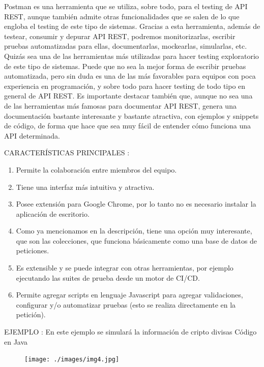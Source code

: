 \documentclass[letterpaper, 12pt, spanish]{article}
\begin{document}
Postman es una herramienta que se utiliza, sobre todo, para el testing de API REST, aunque también admite otras funcionalidades que se salen de lo que engloba el testing de este tipo de sistemas.
Gracias a esta herramienta, además de testear, consumir y depurar API REST, podremos monitorizarlas, escribir pruebas automatizadas para ellas, documentarlas, mockearlas, simularlas, etc.
Quizás sea una de las herramientas más utilizadas para hacer testing exploratorio de este tipo de sistemas. Puede que no sea la mejor forma de escribir pruebas automatizada, pero sin duda es una de las más favorables para equipos con poca experiencia en programación, y sobre todo para hacer testing de todo tipo en general de API REST.
Es importante destacar también que, aunque no sea una de las herramientas más famosas para documentar API REST, genera una documentación bastante interesante y bastante atractiva, con ejemplos y snippets de código, de forma que hace que sea muy fácil de entender cómo funciona una API determinada.

CARACTERÍSTICAS PRINCIPALES :

\begin{enumerate} %
	\item \textbf{}Permite la colaboración entre miembros del equipo.
	\item \textbf{}Tiene una interfaz más intuitiva y atractiva.
	\item \textbf{}Posee extensión para Google Chrome,  por lo tanto no es necesario instalar la aplicación de escritorio.
		\item \textbf{}Como ya mencionamos en la descripción, tiene una opción muy interesante, que son las colecciones, que funciona básicamente como una base de datos de peticiones.
	\item \textbf{}Es extensible y se puede integrar con otras herramientas, por ejemplo ejecutando las suites de prueba desde un motor  de CI/CD.
	\item \textbf{}Permite agregar scripts en lenguaje Javascript para agregar validaciones, configurar y/o automatizar pruebas (esto se realiza directamente en la petición).
	
	
	
\end{enumerate}

EJEMPLO : 
En este ejemplo se simulará la información de cripto divisas 
Código en Java

\begin{figure}[H]
	\begin{center}
		\texttt{[image: ./images/img4.jpg]}
		\caption{}
	\end{center}
\end{figure}
\end{document}
